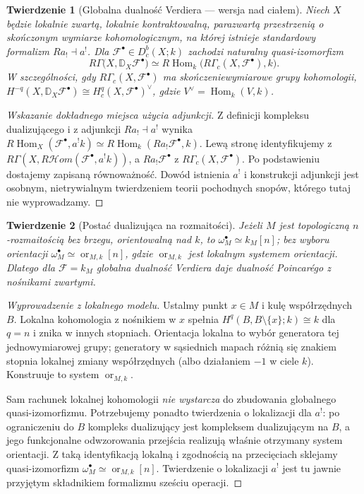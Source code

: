 \documentclass[11pt,a4paper,oneside]{report}
\theoremstyle{plain}
\newtheorem{twierdzenie}{Twierdzenie}[section]
\theoremstyle{definition}
\theoremstyle{remark}
\begin{document}
\begin{twierdzenie}[Globalna dualność Verdiera — wersja nad ciałem]
\label{thm:verdier-global-v12}
Niech $X$ będzie lokalnie zwartą, lokalnie kontraktowalną,
parazwartą przestrzenią o skończonym wymiarze kohomologicznym,
na której istnieje standardowy formalizm $Ra_!\dashv a^!$.
Dla $\mathcal F^\bullet\in D^b_c(X;k)$ zachodzi
naturalny quasi-izomorfizm
\[
R\Gamma\bigl(X,\mathbb D_X\mathcal F^\bullet\bigr)
\simeq R\!\operatorname{Hom}_k
\bigl(R\Gamma_c(X,\mathcal F^\bullet),k\bigr).
\]
W szczególności, gdy $R\Gamma_c(X,\mathcal F^\bullet)$
ma skończeniewymiarowe grupy kohomologii,
$H^{-q}(X,\mathbb D_X\mathcal F^\bullet)
\cong H_c^q(X,\mathcal F^\bullet)^\vee$,
gdzie $V^\vee=\operatorname{Hom}_k(V,k)$.
\end{twierdzenie}
\begin{proof}[Wskazanie dokładnego miejsca użycia adjunkcji]
Z definicji kompleksu dualizującego i z adjunkcji
$Ra_!\dashv a^!$ wynika
$R\!\operatorname{Hom}_X(\mathcal F^\bullet,a^!k)
\simeq R\!\operatorname{Hom}_k(Ra_!\mathcal F^\bullet,k)$.
Lewą stronę identyfikujemy z
$R\Gamma(X,R\mathcal Hom(\mathcal F^\bullet,a^!k))$,
a $Ra_!\mathcal F^\bullet$ z
$R\Gamma_c(X,\mathcal F^\bullet)$.
Po podstawieniu dostajemy zapisaną równoważność.
Dowód istnienia $a^!$ i konstrukcji adjunkcji jest
osobnym, nietrywialnym twierdzeniem teorii pochodnych
snopów, którego tutaj nie wyprowadzamy.
\end{proof}

\begin{twierdzenie}[Postać dualizująca na rozmaitości]
\label{thm:verdier-manifold-v12}
Jeżeli $M$ jest topologiczną $n$-rozmaitością bez brzegu,
orientowalną nad $k$, to
$\omega_M^\bullet\simeq k_M[n]$; bez wyboru orientacji
$\omega_M^\bullet\simeq\operatorname{or}_{M,k}[n]$,
gdzie $\operatorname{or}_{M,k}$ jest lokalnym systemem orientacji.
Dlatego dla $\mathcal F=k_M$ globalna dualność Verdiera
daje dualność Poincarégo z nośnikami zwartymi.
\end{twierdzenie}
\begin{proof}[Wyprowadzenie z lokalnego modelu]
Ustalmy punkt $x\in M$ i kulę współrzędnych $B$.
Lokalna kohomologia z nośnikiem w $x$ spełnia
$H^q(B,B\setminus\{x\};k)\cong k$ dla $q=n$
i znika w innych stopniach. Orientacja lokalna to
wybór generatora tej jednowymiarowej grupy; generatory
w sąsiednich mapach różnią się znakiem stopnia
lokalnej zmiany współrzędnych (albo działaniem $-1$
w ciele $k$). Konstruuje to system $\operatorname{or}_{M,k}$.

Sam rachunek lokalnej kohomologii \emph{nie wystarcza}
do zbudowania globalnego quasi-izomorfizmu. Potrzebujemy
ponadto twierdzenia o lokalizacji dla $a^!$:
po ograniczeniu do $B$ kompleks dualizujący jest
kompleksem dualizującym na $B$, a jego funkcjonalne
odwzorowania przejścia realizują właśnie otrzymany
system orientacji. Z taką identyfikacją lokalną i
zgodnością na przecięciach sklejamy quasi-izomorfizm
$\omega_M^\bullet\simeq\operatorname{or}_{M,k}[n]$.
Twierdzenie o lokalizacji $a^!$ jest tu jawnie
przyjętym składnikiem formalizmu sześciu operacji.
\end{proof}
\end{document}
